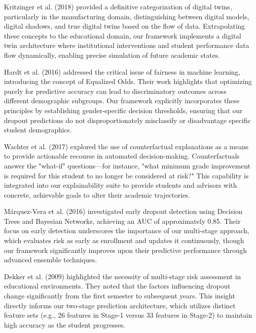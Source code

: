 \documentclass[12pt,a4paper]{report}
\begin{document}
Kritzinger et al. (2018) \cite{kritzinger2018} provided a definitive categorization of digital twins, particularly in the manufacturing domain, distinguishing between digital models, digital shadows, and true digital twins based on the flow of data. Extrapolating these concepts to the educational domain, our framework implements a digital twin architecture where institutional interventions and student performance data flow dynamically, enabling precise simulation of future academic states.

Hardt et al. (2016) \cite{hardt2016} addressed the critical issue of fairness in machine learning, introducing the concept of Equalized Odds. Their work highlights that optimizing purely for predictive accuracy can lead to discriminatory outcomes across different demographic subgroups. Our framework explicitly incorporates these principles by establishing gender-specific decision thresholds, ensuring that our dropout predictions do not disproportionately misclassify or disadvantage specific student demographics.

Wachter et al. (2017) \cite{wachter2017} explored the use of counterfactual explanations as a means to provide actionable recourse in automated decision-making. Counterfactuals answer the "what-if" questions—for instance, "what minimum grade improvement is required for this student to no longer be considered at risk?" This capability is integrated into our explainability suite to provide students and advisors with concrete, achievable goals to alter their academic trajectories.

Márquez-Vera et al. (2016) \cite{marquez2016} investigated early dropout detection using Decision Trees and Bayesian Networks, achieving an AUC of approximately 0.85. Their focus on early detection underscores the importance of our multi-stage approach, which evaluates risk as early as enrollment and updates it continuously, though our framework significantly improves upon their predictive performance through advanced ensemble techniques.

Dekker et al. (2009) \cite{dekker2009} highlighted the necessity of multi-stage risk assessment in educational environments. They noted that the factors influencing dropout change significantly from the first semester to subsequent years. This insight directly informs our two-stage prediction architecture, which utilizes distinct feature sets (e.g., 26 features in Stage-1 versus 33 features in Stage-2) to maintain high accuracy as the student progresses.
\end{document}

